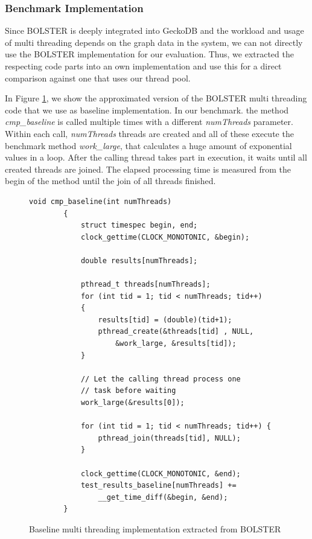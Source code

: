 \documentclass[conference]{IEEEtran}
\begin{document}
\subsubsection{Benchmark Implementation}
Since BOLSTER is deeply integrated into GeckoDB and the workload and usage of multi threading depends on the graph data in the system, we can not directly use the BOLSTER implementation for our evaluation. Thus, we extracted the respecting code parts into an own implementation and use this for a direct comparison against one that uses our thread pool. 

In Figure \ref{fig4}, we show the approximated version of the BOLSTER multi threading code that we use as baseline implementation. In our benchmark. the method \emph{cmp\_baseline} is called multiple times with a different \emph{numThreads} parameter. Within each call, \emph{numThreads} threads are created and all of these execute the benchmark method \emph{work\_large}, that calculates a huge amount of exponential values in a loop. After the calling thread takes part in execution, it waits until all created threads are joined. The elapsed processing time is measured from the begin of the method until the join of all threads finished.

\begin{figure}
	\begin{lstlisting}[style=CStyle]
		void cmp_baseline(int numThreads)
		{
			struct timespec begin, end;
			clock_gettime(CLOCK_MONOTONIC, &begin);
			
			double results[numThreads];
			
			pthread_t threads[numThreads];
			for (int tid = 1; tid < numThreads; tid++)
			{
				results[tid] = (double)(tid+1);
				pthread_create(&threads[tid] , NULL, 
					&work_large, &results[tid]);
			}
			
			// Let the calling thread process one 
			// task before waiting
			work_large(&results[0]);
			
			for (int tid = 1; tid < numThreads; tid++) {
				pthread_join(threads[tid], NULL);
			}
			
			clock_gettime(CLOCK_MONOTONIC, &end);
			test_results_baseline[numThreads] +=
				__get_time_diff(&begin, &end);
		}
	\end{lstlisting}
	\caption{Baseline multi threading implementation extracted from BOLSTER}
	\label{fig4}
\end{figure}
\end{document}

